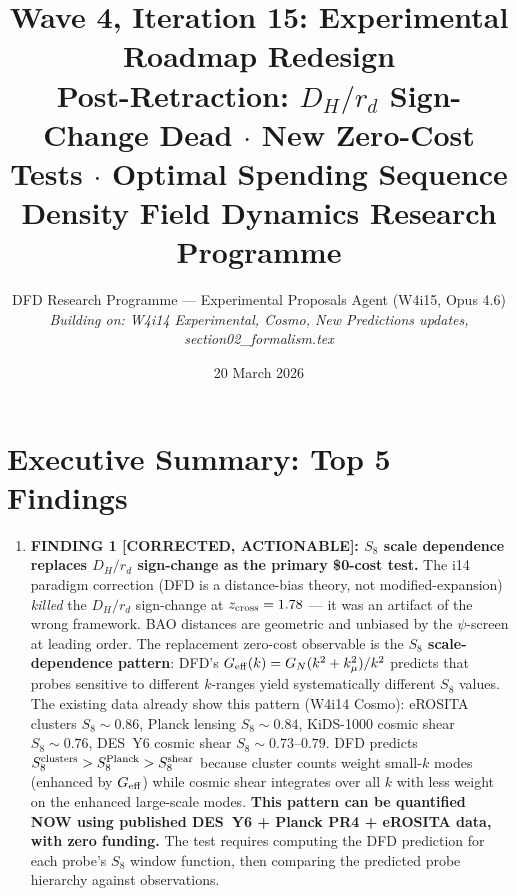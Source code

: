 \documentclass[11pt]{article}
\title{Wave 4, Iteration 15: Experimental Roadmap Redesign\\
\large Post-Retraction: $D_H/r_d$ Sign-Change Dead $\cdot$
New Zero-Cost Tests $\cdot$ Optimal Spending Sequence\\[6pt]
\normalsize Density Field Dynamics Research Programme}
\author{DFD Research Programme --- Experimental Proposals Agent (W4i15, Opus 4.6)\\
\textit{Building on: W4i14 Experimental, Cosmo, New Predictions updates,\\
section02\_formalism.tex}}
\date{20 March 2026}
\newcommand{\Geff}{G_{\rm eff}}
\begin{document}
\maketitle

\section*{Executive Summary: Top 5 Findings}

\begin{tcolorbox}[colback=blue!5!white, colframe=blue!60!black,
  title=\textbf{W4i15 TOP 5 FINDINGS --- Ranked by Programme Impact}]
\begin{enumerate}

\item \textbf{FINDING 1 [CORRECTED, ACTIONABLE]: $S_8$ scale dependence
replaces $D_H/r_d$ sign-change as the primary \$0-cost test.}
The i14 paradigm correction (DFD is a distance-bias theory, not
modified-expansion) \emph{killed} the $D_H/r_d$ sign-change at
$z_{\rm cross} = 1.78$ --- it was an artifact of the wrong framework.
BAO distances are geometric and unbiased by the $\psi$-screen at
leading order. The replacement zero-cost observable is the
\textbf{$S_8$ scale-dependence pattern}: DFD's $\Geff(k) = G_N(k^2 +
k_\mu^2)/k^2$ predicts that probes sensitive to different $k$-ranges
yield systematically different $S_8$ values. The existing data already
show this pattern (W4i14 Cosmo): eROSITA clusters $S_8 \sim 0.86$,
Planck lensing $S_8 \sim 0.84$, KiDS-1000 cosmic shear $S_8 \sim 0.76$,
DES~Y6 cosmic shear $S_8 \sim 0.73$--$0.79$. DFD predicts
$S_8^{\rm clusters} > S_8^{\rm Planck} > S_8^{\rm shear}$ because
cluster counts weight small-$k$ modes (enhanced by $\Geff$) while
cosmic shear integrates over all $k$ with less weight on the enhanced
large-scale modes. \textbf{This pattern can be quantified NOW using
published DES~Y6 + Planck PR4 + eROSITA data, with zero funding.}
The test requires computing the DFD prediction for each probe's
$S_8$ window function, then comparing the predicted probe hierarchy
against observations.


\end{enumerate}
\end{tcolorbox}
\end{document}
